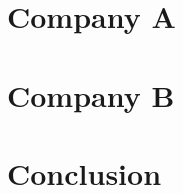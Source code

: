 \documentclass[a4paper,12pt]{report}
\begin{document}
\newpage
\tableofcontents
\pagebreak

\section{Company A}



\section{Company B}



\section{Conclusion}

\end{document}
